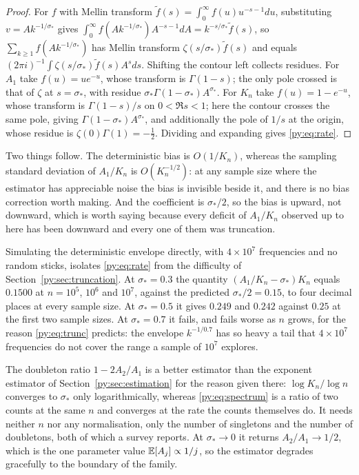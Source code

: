 \begin{proof}
For $f$ with Mellin transform $\tilde f(s) = \int_0^\infty f(u)u^{-s-1}du$, substituting
$v = Ak^{-1/\sigma_*}$ gives $\int_0^\infty f(Ak^{-1/\sigma_*})A^{-s-1}dA = k^{-s/\sigma_*}\tilde f(s)$,
so $\sum_{k\ge1} f(Ak^{-1/\sigma_*})$ has Mellin transform $\zeta(s/\sigma_*)\tilde f(s)$ and equals
$(2\pi i)^{-1}\int \zeta(s/\sigma_*)\tilde f(s)A^{s}ds$. Shifting the contour left collects
residues. For $A_1$ take $f(u) = ue^{-u}$, whose transform is $\Gamma(1-s)$; the only pole crossed
is that of $\zeta$ at $s = \sigma_*$, with residue $\sigma_*\Gamma(1-\sigma_*)A^{\sigma_*}$. For
$K_n$ take $f(u) = 1-e^{-u}$, whose transform is $\Gamma(1-s)/s$ on $0 < \Re s < 1$; here the
contour crosses the same pole, giving $\Gamma(1-\sigma_*)A^{\sigma_*}$, and additionally the pole
of $1/s$ at the origin, whose residue is $\zeta(0)\Gamma(1) = -\tfrac12$. Dividing and expanding
gives \eqref{py:eq:rate}.
\end{proof}

Two things follow. The deterministic bias is $O(1/K_n)$, whereas the sampling standard deviation of
$A_1/K_n$ is $O(K_n^{-1/2})$: at any sample size where the estimator has appreciable noise the bias
is invisible beside it, and there is no bias correction worth making. And the coefficient is
$\sigma_*/2$, so the bias is upward, not downward, which is worth saying because every deficit
of $A_1/K_n$ observed up to here has been downward and every one of them was truncation.

Simulating the deterministic envelope directly, with $4\times10^{7}$ frequencies and no random
sticks, isolates \eqref{py:eq:rate} from the difficulty of Section~\ref{py:sec:truncation}. At
$\sigma_* = 0.3$ the quantity $(A_1/K_n - \sigma_*)K_n$ equals $0.1500$ at $n = 10^{5}$, $10^{6}$
and $10^{7}$, against the predicted $\sigma_*/2 = 0.15$, to four decimal places at every sample
size. At $\sigma_* = 0.5$ it gives $0.249$ and $0.242$ against $0.25$ at the first two sample sizes.
At $\sigma_* = 0.7$ it fails, and fails worse as $n$ grows, for the reason \eqref{py:eq:trunc}
predicts: the envelope $k^{-1/0.7}$ has so heavy a tail that $4\times10^{7}$ frequencies do not
cover the range a sample of $10^{7}$ explores.

The doubleton ratio $1-2A_2/A_1$ is a better estimator than the exponent estimator of Section~\ref{py:sec:estimation} for the reason given there:
$\log K_n/\log n$ converges to $\sigma_*$ only logarithmically, whereas \eqref{py:eq:spectrum} is a
ratio of two counts at the same $n$ and converges at the rate the counts themselves do. It needs
neither $n$ nor any normalisation, only the number of singletons and the number of doubletons, both
of which a survey reports. At $\sigma_* \to 0$ it returns $A_2/A_1 \to 1/2$, which is the
one parameter value $\mathbb{E}[A_j] \propto 1/j$, so the estimator degrades gracefully to the boundary of
the family.

